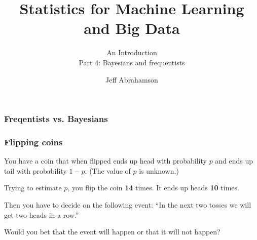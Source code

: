 

\title
{Statistics for Machine Learning and Big Data}
\subtitle{An Introduction\\[6mm] Part 4: Bayesians and frequentists}

\author[Abrahamson] {Jeff Abrahamson}




\begin{frame}
  \titlepage
\end{frame}

\begin{frame}

\end{frame}

\begin{frame}
  \frametitle{Freqentists vs. Bayesians}

  \vfill
  \centerline{}
\end{frame}


\begin{frame}
  \frametitle{Flipping coins}

  You have a coin that when flipped ends up head with probability $p$
  and ends up tail with probability $1-p$. (The value of $p$ is
  unknown.)

  Trying to estimate $p$, you flip the coin \textbf{14} times. It ends
  up heads \textbf{10} times.

  Then you have to decide on the following event: ``In the next two
  tosses we will get two heads in a row.''

  Would you bet that the event will happen or that it will not happen?

  \vfill

  \cnote{

  }
\end{frame}

